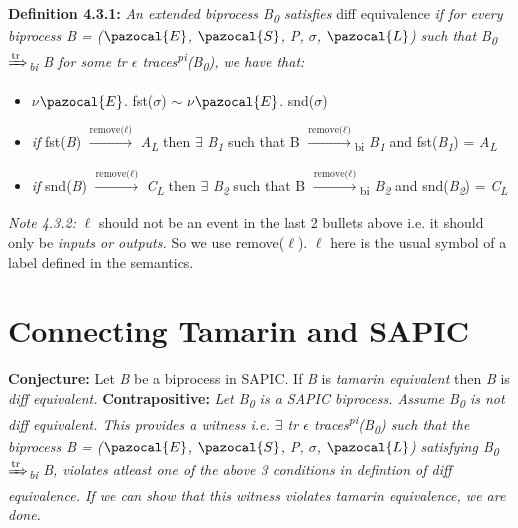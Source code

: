 \documentclass[11pt]{article}
\newcommand{\Sa}{\pazocal{S}}
\newcommand{\Lb}{\pazocal{L}}
\newcommand{\Ea}{\pazocal{E}}
\begin{document}
{\bf Definition 4.3.1: }{\it An extended biprocess B\textsubscript{0} satisfies} diff equivalence {\it if for every biprocess B = ($\Ea$, $\Sa$, P, $\sigma$, $\Lb$) such that B\textsubscript{0} {$\xRightarrow[\text{}]{\text{tr}}$}\textsubscript{bi} B for some tr $\epsilon$ traces\textsuperscript{pi}(B\textsubscript{0}), we have that:}
\begin{itemize}
  \vspace{-6pt}
  \item $\nu$$\Ea$. fst($\sigma$) $\sim$ $\nu$$\Ea$. snd($\sigma$)
  \vspace{-3pt}
  \item {\it if} fst({\it B}) {$\xrightarrow[\text{}]{\text{remove($\ell$)}}$} {\it A}\textsubscript{{\it L}} then {$\exists$} {\it B\textsubscript{1}} such that 
  B {$\xrightarrow[\text{}]{\text{remove($\ell$)}}$}{\textsubscript{bi}} {\it B\textsubscript{1}} and fst({\it B\textsubscript{1}}) = {\it A}\textsubscript{{\it L}}
  \vspace{-6pt}
  \item {\it if} snd({\it B}) {$\xrightarrow[\text{}]{\text{remove($\ell$)}}$} {\it C}\textsubscript{{\it L}} then {$\exists$} {\it B\textsubscript{2}} such that 
  B {$\xrightarrow[\text{}]{\text{remove($\ell$)}}$}{\textsubscript{bi}} {\it B\textsubscript{2}} and snd({\it B\textsubscript{2}}) = {\it C}\textsubscript{{\it L}}
\end{itemize}
\vspace{3pt}
{\it Note 4.3.2:} $\ell$ should not be an event in the last 2 bullets above i.e. it should only be {\it inputs or outputs.} So we use remove($\ell$). $\ell$ here is the usual symbol of a label defined in the semantics.
\vspace{3pt}

\section {Connecting Tamarin and SAPIC}
\vspace{8pt}
{\bf Conjecture:} Let {\it B} be a biprocess in SAPIC. If {\it B} is {\it tamarin equivalent} then {\it B} is {\it diff equivalent.}\newline\newline
{\bf Contrapositive: }{\it Let B\textsubscript{0} is a SAPIC biprocess. Assume B\textsubscript{0} is not diff equivalent. This provides a witness i.e. $\exists$ tr $\epsilon$ traces\textsuperscript{pi}(B\textsubscript{0}) such that the biprocess B = ($\Ea$, $\Sa$, P, $\sigma$, $\Lb$) satisfying B\textsubscript{0} {$\xRightarrow[\text{}]{\text{tr}}$}\textsubscript{bi} B, violates atleast one of the above 3 conditions in defintion of diff equivalence. If we can show that this witness violates tamarin equivalence, we are done.}\newline
\end{document}
